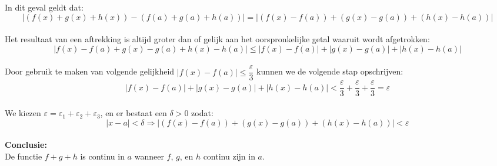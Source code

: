 \documentclass[a4paper]{article}
\begin{document}
In dit geval geldt dat:\\
  
$$ |(f(x) + g(x) + h(x)) - (f(a) + g(a) + h(a))| = |(f(x) - f(a)) + (g(x) - g(a)) + (h(x) - h(a))| $$\\  

Het resultaat van een aftrekking is altijd groter dan of gelijk aan het oorspronkelijke getal waaruit wordt afgetrokken:\\  

$$ |f(x) - f(a) + g(x) - g(a) + h(x) - h(a)| \leq |f(x) - f(a)| + |g(x) - g(a)| + |h(x) - h(a)| $$\\  

Door gebruik te maken van volgende gelijkheid $|f(x) - f(a)| \leq \dfrac{\varepsilon}{3}$ kunnen we de volgende stap opschrijven:\\  

$$ |f(x) - f(a)| + |g(x) - g(a)| + |h(x) - h(a)| < \dfrac{\varepsilon}{3} + \dfrac{\varepsilon}{3} + \dfrac{\varepsilon}{3} = \varepsilon $$\\  

We kiezen $ \varepsilon = \varepsilon_1 + \varepsilon_2 + \varepsilon_3 $, en er bestaat een $\delta > 0$ zodat:\\  

$$ |x - a| < \delta \Rightarrow |(f(x) - f(a)) + (g(x) - g(a)) + (h(x) - h(a))| < \varepsilon $$\\  

\textbf{Conclusie:}\\  

De functie $f+g+h$ is continu in $a$ wanneer $f$, $g$, en $h$ continu zijn in $a$. \\  



\begin{thebibliography}{99}

\end{thebibliography}
\end{document}
